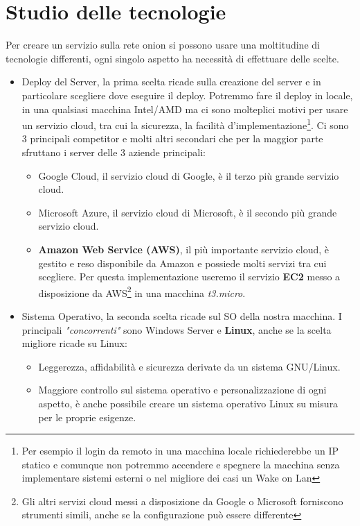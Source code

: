 \newpage
\section{Studio delle tecnologie}
Per creare un servizio sulla rete onion si possono usare una moltitudine di tecnologie differenti, ogni singolo aspetto ha necessità di effettuare delle scelte. \\
\begin{itemize}
    \item Deploy del Server, la prima scelta ricade sulla creazione del server e in particolare scegliere dove eseguire il deploy. Potremmo fare il deploy in locale, in una qualsiasi macchina Intel/AMD ma ci sono molteplici motivi per usare un servizio cloud, tra cui la sicurezza, la facilità d'implementazione\footnote{Per esempio il login da remoto in una macchina locale richiederebbe un IP statico e comunque non potremmo accendere e spegnere la macchina senza implementare sistemi esterni o nel migliore dei casi un Wake on Lan}. Ci sono 3 principali competitor e molti altri secondari che per la maggior parte sfruttano i server delle 3 aziende principali: 
    \begin{itemize}
        \item Google Cloud, il servizio cloud di Google, è il terzo più grande servizio cloud.
        \item Microsoft Azure, il servizio cloud di Microsoft, è il secondo più grande servizio cloud.
        \item \textbf{Amazon Web Service (AWS)}, il più importante servizio cloud, è gestito e reso disponibile da Amazon e possiede molti servizi tra cui scegliere. Per questa implementazione useremo il servizio \textbf{EC2} messo a disposizione da AWS\footnote{Gli altri servizi cloud messi a disposizione da Google o Microsoft forniscono strumenti simili, anche se la configurazione può essere differente} in una macchina \emph{t3.micro}.
    \end{itemize}
    \item Sistema Operativo, la seconda scelta ricade sul SO della nostra macchina. I principali \emph{"concorrenti"} sono Windows Server e \textbf{Linux}, anche se la scelta migliore ricade su Linux:
    \begin{itemize}
        \item Leggerezza, affidabilità e sicurezza derivate da un sistema GNU/Linux.
        \item Maggiore controllo sul sistema operativo e personalizzazione di ogni aspetto, è anche possibile creare un sistema operativo Linux su misura per le proprie esigenze.

\end{itemize}
\end{itemize}
